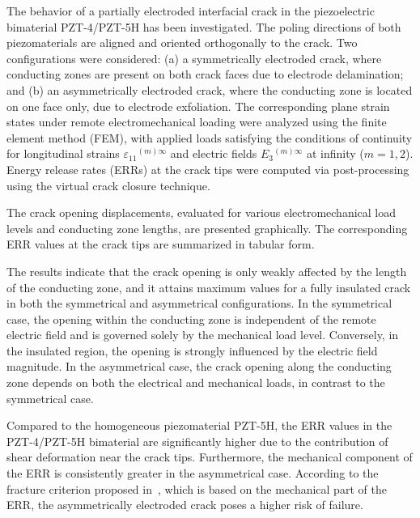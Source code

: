 The behavior of a partially electroded interfacial crack in the piezoelectric bimaterial PZT-4/PZT-5H has been investigated. The poling directions of both piezomaterials are aligned and oriented orthogonally to the crack. Two configurations were considered: (a) a symmetrically electroded crack, where conducting zones are present on both crack faces due to electrode delamination; and (b) an asymmetrically electroded crack, where the conducting zone is located on one face only, due to electrode exfoliation. The corresponding plane strain states under remote electromechanical loading were analyzed using the finite element method (FEM), with applied loads satisfying the conditions of continuity for longitudinal strains $\varepsilon_{11}{}^{(m)\infty}$ and electric fields $E_{3}{}^{(m)\infty}$ at infinity ($m = 1,2$). Energy release rates (ERRs) at the crack tips were computed via post-processing using the virtual crack closure technique.

The crack opening displacements, evaluated for various electromechanical load levels and conducting zone lengths, are presented graphically. The corresponding ERR values at the crack tips are summarized in tabular form.

The results indicate that the crack opening is only weakly affected by the length of the conducting zone, and it attains maximum values for a fully insulated crack in both the symmetrical and asymmetrical configurations. In the symmetrical case, the opening within the conducting zone is independent of the remote electric field and is governed solely by the mechanical load level. Conversely, in the insulated region, the opening is strongly influenced by the electric field magnitude. In the asymmetrical case, the crack opening along the conducting zone depends on both the electrical and mechanical loads, in contrast to the symmetrical case.

Compared to the homogeneous piezomaterial PZT-5H, the ERR values in the PZT-4/PZT-5H bimaterial are significantly higher due to the contribution of shear deformation near the crack tips. Furthermore, the mechanical component of the ERR is consistently greater in the asymmetrical case. According to the fracture criterion proposed in~\cite{Adlucky55}, which is based on the mechanical part of the ERR, the asymmetrically electroded crack poses a higher risk of failure.


